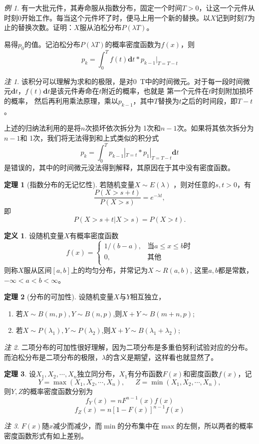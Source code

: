 \documentclass[a4paper,11pt]{article}%
\theoremstyle{remark}
\newtheorem*{remark}{注}
\theoremstyle{remark}
\newtheorem*{example}{例}
\theoremstyle{definition}
\newtheorem{theorem}{定理}[section]
\theoremstyle{definition}
\newtheorem*{definition}{定义}
\theoremstyle{plain}
\begin{document}
\begin{example}
    有一大批元件，其寿命服从指数分布，固定一个时间$T>0$，让这一个元件从时刻0开始工作。每当这个元件坏了时，便马上用一个新的替换。以$X$记到时刻$T$为止的替换次数。证明：$X$服从泊松分布$P(\lambda T)$。

    易得$p_0$的值。记泊松分布$P(\lambda T)$的概率密度函数为$f(x)$，则
    \[p_k=\int_{0}^{T}f(t)\mathbf{d}t*p_{k-1}|_{T=T-t}\]
    \begin{remark}
        该积分可以理解为求和的极限，是对0~T中的时间微元。对于每一段时间微元$\mathbf{d}t$，$f(t)\mathbf{d}t$是该元件寿命在$t$附近的概率，也就是
        第一个元件在$t$时刻附加损坏的概率，
        然后再利用乘法原理，乘以$p_{k-1}$，其中$T$替换为$t$之后的时间段，即$T-t$。

        上述的归纳法利用的是将$n$次损坏依次拆分为 1次和$n-1$次。如果将其依次拆分为$n-1$和 1次，我们将无法得到和上式类似的积分式
        \[p_k=\int_{0}^{T}p_{k-1}|_{T=t}*p_1|_{T=T-t}\mathbf{d}t\]
        是错误的，其中的时间微元没法得到解释，其原因在于其中没有密度函数。
    \end{remark}
\end{example}
\begin{theorem}[指数分布的无记忆性]
   若随机变量$X\sim E(\lambda)$ ，则对任意的$s,t>0$，有 
   \[\frac{P(X>s+t)}{P(X>s)}=e^{-\lambda t},\]
   即 
   \[P(X>s+t|X>s)=P(X>t).\]
\end{theorem}
\begin{definition}
    设随机变量$X$有概率密度函数
    \[f(x)=\begin{cases}
        1/(b-a),&\text{当}a\leq x\leq b \text{时}\\
        0,&\text{其他}\\
    \end{cases}\]
    则称$X$服从区间$[a,b]$上的均匀分布，并常记为$X\sim R(a,b)$,
    这里$a,b$都是常数，$-\infty<a<b<\infty$。
\end{definition}

\begin{theorem}[分布的可加性]
   设随机变量$X$与$Y$相互独立， 
   \begin{enumerate}
    \item 若$X\sim B(m,p),Y\sim B(n,p)$,则$X+Y\sim B(m+n,p)$;
    \item 若$X\sim P(\lambda_1),Y\sim P(\lambda_2)$,则$X+Y\sim B(\lambda_1+\lambda_2)$;
   \end{enumerate} 
   \begin{remark}
    二项分布的可加性很好理解，因为二项分布是多重伯努利试验对应的分布。而泊松分布是二项分布的极限，$\lambda$的含义是期望，这样看也就显然了。
   \end{remark}
\end{theorem}
\begin{theorem}
    设$X_1,X_2,\cdots,X_n$独立同分布，$X_1$有分布函数$F(x)$和密度函数$f(x)$，记
    \[Y=\max{(X_1,X_2,\cdots,X_n)},\phantom{111}Z=\min{(X_1,X_2,\cdots,X_n)},\]
    则$Y,Z$的概率密度函数分别为
    \[f_Y(x)=nF^{n-1}(x)f(x)\]
    \[f_Z(x)=n[1-F(x)]^{n-1}f(x)\]
\end{theorem}
\begin{remark}$F(x)$随$x$减少而减少，而$\min$的分布集中在$\max$的左侧，所以两者的概率密度函数形式有如上差别。
\end{remark}
\end{document}
